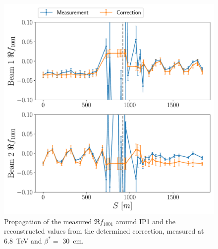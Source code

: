 \begin{figure}[!htb]
    \centering
    \includegraphics*[width=\columnwidth]{Figures/Chapter6/commissioning_sbs_real_f1001_ip1.pdf}
    \caption{Propagation of the measured \(\Re f_{1001}\) around IP1 and the reconstructed values from the determined correction, measured at \qty{6.8}{\tera\electronvolt} and \(\beta^{*}=\) \qty{30}{\centi\meter}.}
    \label{fig:commissioning_sbs_real_f1001_ip1}
\end{figure}

